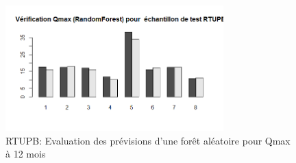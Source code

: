 \begin{figure}[H]
\centering
\includegraphics[width=0.75\textwidth]{../Fig/RTUPB/rtupb-forest-test-qmax12.png}
\caption{RTUPB: Evaluation des prévisions d'une forêt aléatoire pour Qmax à 12 mois}
\label{fig-rtupb-forest-test-qmax12}
\end{figure}

